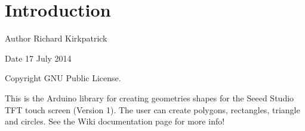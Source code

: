 \hypertarget{index_intro_sec}{}\section{Introduction}\label{index_intro_sec}
\begin{DoxyAuthor}{Author}
Richard Kirkpatrick 
\end{DoxyAuthor}
\begin{DoxyDate}{Date}
17 July 2014 
\end{DoxyDate}
\begin{DoxyCopyright}{Copyright}
G\+N\+U Public License.
\end{DoxyCopyright}
This is the Arduino library for creating geometries shapes for the Seeed Studio T\+F\+T touch screen (Version 1). The user can create polygons, rectangles, triangle and circles. See the Wiki documentation page for more info! 